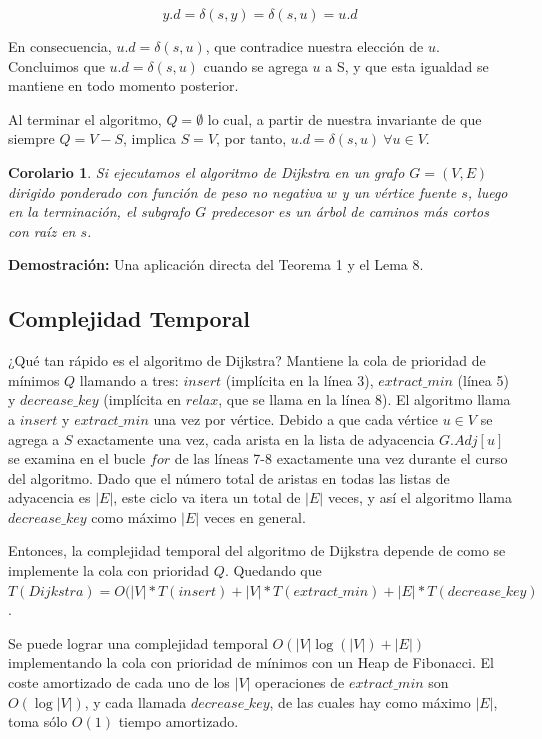 \documentclass[12pt]{article}
\newcommand{\proof}{\textbf{Demostración:} }
\newcommand{\nl}{\vspace{0.3cm}}
\newtheorem{corollary}{Corolario}
\begin{document}
$$ y.d = \delta(s, y) = \delta(s, u) = u.d $$

En consecuencia, $u.d = \delta(s, u)$, que contradice nuestra elección de $u$. Concluimos que $u.d = \delta(s, u)$ cuando se agrega $u$ a S, y que esta igualdad se mantiene en todo momento posterior.

\nl

Al terminar el algoritmo, $Q = \emptyset$ lo cual, a partir de nuestra invariante de que siempre $Q = V - S$, implica $S = V$, por tanto, $u.d = \delta(s, u) \ \forall u \in V$.

\begin{corollary}
	Si ejecutamos el algoritmo de Dijkstra en un grafo $G = (V,E) $ dirigido ponderado con función de peso no negativa $w$ y un vértice fuente $s$, luego en la terminación, el subgrafo $G$ predecesor es un árbol de caminos más cortos con raíz en $s$.
\end{corollary}

\proof Una aplicación directa del Teorema 1 y el Lema 8.

\subsection{Complejidad Temporal}

¿Qué tan rápido es el algoritmo de Dijkstra? Mantiene la cola de prioridad de mínimos $Q$ llamando a tres: $insert$ (implícita en la línea 3), $extract\_min$ (línea 5) y $decrease\_key$ (implícita en $relax$, que se llama en la línea 8). El algoritmo llama a $insert$ y $extract\_min$ una vez por vértice. Debido a que cada vértice $u \in V$ se agrega a $S$ exactamente una vez, cada arista en la lista de adyacencia $G.Adj [u]$ se examina en el bucle $for$ de las líneas 7-8 exactamente una vez durante el curso del algoritmo. Dado que el número total de aristas en todas las listas de adyacencia es $|E|$, este ciclo va itera un total de $|E|$ veces, y así el algoritmo llama $decrease\_key$ como máximo $|E|$ veces en general.

\nl

Entonces, la complejidad temporal del algoritmo de Dijkstra depende de como se implemente la cola con prioridad $Q$. Quedando que $T(Dijkstra) = O(|V| * T(insert) + |V| * T(extract\_min) + |E| * T(decrease\_key)$.

\nl

Se puede lograr una complejidad temporal  $O(|V| \log(|V|) + |E|)$ implementando la cola con prioridad de mínimos con un Heap de Fibonacci. El coste amortizado de cada uno de los $|V|$ operaciones de $extract\_min$ son $O(\log|V|)$, y cada llamada $decrease\_key$, de las cuales hay como máximo $|E|$, toma sólo $O(1)$ tiempo amortizado.
\end{document}
